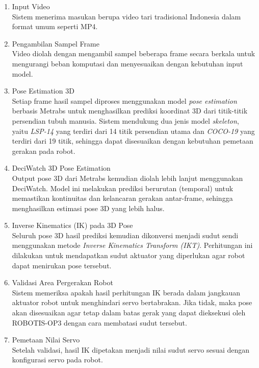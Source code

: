 \begin{enumerate}
    \item {Input Video} \\
    Sistem menerima masukan berupa video tari tradisional Indonesia dalam format umum seperti MP4.
    
    \item {Pengambilan Sampel Frame} \\
    Video diolah dengan mengambil sampel beberapa frame secara berkala untuk mengurangi beban komputasi dan menyesuaikan dengan kebutuhan input model.
    
    \item {Pose Estimation 3D} \\
    Setiap frame hasil sampel diproses menggunakan model \textit{pose estimation} berbasis Metrabs untuk menghasilkan prediksi koordinat 3D dari titik-titik persendian tubuh manusia. Sistem mendukung dua jenis model \textit{skeleton}, yaitu \textit{LSP-14} yang terdiri dari 14 titik persendian utama dan \textit{COCO-19} yang terdiri dari 19 titik, sehingga dapat disesuaikan dengan kebutuhan pemetaan gerakan pada robot.
    
    \item {DeciWatch 3D Pose Estimation} \\
    Output pose 3D dari Metrabs kemudian diolah lebih lanjut menggunakan DeciWatch. Model ini melakukan prediksi berurutan (temporal) untuk memastikan kontinuitas dan kelancaran gerakan antar-frame, sehingga menghasilkan estimasi pose 3D yang lebih halus.
    
    \item {Inverse Kinematics (IK) pada 3D Pose} \\
    Seluruh pose 3D hasil prediksi kemudian dikonversi menjadi sudut sendi menggunakan metode \textit{Inverse Kinematics Transform (IKT)}. Perhitungan ini dilakukan untuk mendapatkan sudut aktuator yang diperlukan agar robot dapat menirukan pose tersebut.
    
    \item {Validasi Area Pergerakan Robot} \\
    Sistem memeriksa apakah hasil perhitungan IK berada dalam jangkauan aktuator robot untuk menghindari servo bertabrakan. Jika tidak, maka pose akan disesuaikan agar tetap dalam batas gerak yang dapat dieksekusi oleh ROBOTIS-OP3 dengan cara membatasi sudut tersebut.
    
    \item {Pemetaan Nilai Servo} \\
    Setelah validasi, hasil IK dipetakan menjadi nilai sudut servo sesuai dengan konfigurasi servo pada robot.
    

\end{enumerate}
